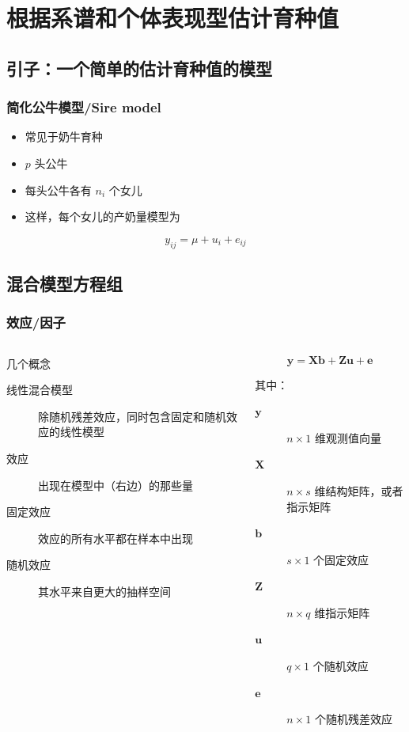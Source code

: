 \documentclass[serif,aspectratio=169]{beamer}
\begin{document}
\section{根据系谱和个体表现型估计育种值}
\subsection{引子：一个简单的估计育种值的模型}
\begin{frame}
  \frametitle{简化公牛模型/Sire model}
  \begin{itemize}
  \item 常见于奶牛育种
  \item $p$ 头公牛    
  \item 每头公牛各有 $n_i$ 个女儿
  \item 这样，每个女儿的产奶量模型为
  \end{itemize}
  $$y_{ij} = \mu+u_i+e_{ij}$$
\end{frame}


\subsection{混合模型方程组}
\begin{frame}
  \frametitle{效应/因子}
  \begin{columns}
    \begin{column}{.55\textwidth}
      \begin{block}{几个概念}
        \begin{description}%
        \item [线性混合模型] 除随机残差效应，同时包含固定和随机效应的线性模型
        \item [效应] 出现在模型中（右边）的那些量
        \item [固定效应] 效应的所有水平都在样本中出现
        \item [随机效应] 其水平来自更大的抽样空间
        \end{description}
      \end{block}
    \end{column}

    \pause
    \begin{column}{.45\textwidth}
      $$\mathbf{y=Xb+Zu+e}$$

      \begin{block}{其中：}
        \begin{description}
        \item [$\mathbf{y}$] $n\times 1$ 维观测值向量
        \item [$\mathbf{X}$] $n\times s$ 维结构矩阵，或者指示矩阵
        \item [$\mathbf{b}$] $s\times 1$ 个固定效应
        \item [$\mathbf{Z}$] $n\times q$ 维指示矩阵
        \item [$\mathbf{u}$] $q\times 1$ 个随机效应
        \item [$\mathbf{e}$] $n\times 1$ 个随机残差效应
        \end{description}
      \end{block}
    \end{column}
  \end{columns}
\end{frame}
\end{document}
